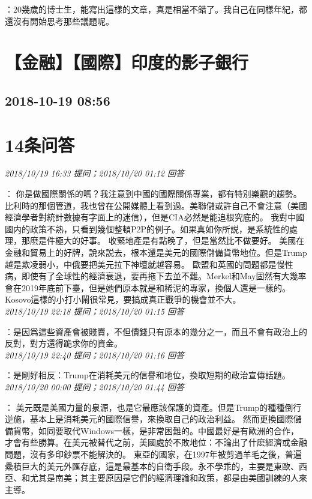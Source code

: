 \documentclass[twocolumn]{ctexart}
\begin{document}
：20幾歲的博士生，能寫出這樣的文章，真是相當不錯了。我自己在同樣年紀，都還沒有開始思考那些議題呢。
\\


\section{【金融】【國際】印度的影子銀行}
\subsection{2018-10-19 08:56}


\section{14条问答}

\textit{\hfill\noindent\small 2018/10/19 16:33 提问；2018/10/20 01:12 回答}

：
你是做國際關係的嗎？我注意到中國的國際關係專業，都有特別樂觀的趨勢。
比利時的那個管道，我也曾在公開媒體上看到過。美聯儲或許自己不會注意（美國經濟學者對統計數據有字面上的迷信），但是CIA必然是能追根究底的。
我對中國國内的政策不熟，只看到幾個整頓P2P的例子。如果真如你所説，是系統性的處理，那麽是件極大的好事。
收緊地產是有點晚了，但是當然比不做要好。
美國在金融和貿易上的好牌，說來説去，根本還是美元的國際儲備貨幣地位。但是Trump越是欺凌弱小，中俄要把美元拉下神壇就越容易。
歐盟和英國的問題都是慢性病，即使有了全球性的經濟衰退，要再拖下去並不難。Merkel和May固然有大幾率會在2019年底前下臺，但是她們原本就是和稀泥的專家，換個人還是一樣的。Kosovo這樣的小打小鬧很常見，要搞成真正戰爭的機會並不大。
\\

\textit{\hfill\noindent\small 2018/10/19 22:18 提问；2018/10/20 01:15 回答}

：是因爲這些資產會被賤賣，不但價錢只有原本的幾分之一，而且不會有政治上的反對，對方還得跪求你的資金。
\\

\textit{\hfill\noindent\small 2018/10/19 22:40 提问；2018/10/20 01:16 回答}

：是剛好相反：Trump在消耗美元的信譽和地位，換取短期的政治宣傳話題。
\\

\textit{\hfill\noindent\small 2018/10/20 00:00 提问；2018/10/20 01:44 回答}

：
美元既是美國力量的泉源，也是它最應該保護的資產。但是Trump的種種倒行逆施，基本上是消耗美元的國際信譽，來換取自己的政治利益。
然而更換國際儲備貨幣，如同要取代Windows一樣，是非常困難的。中國最好是有歐洲的合作，才會有些勝算。在美元被替代之前，美國處於不敗地位：不論出了什麽經濟或金融問題，沒有多印鈔票不能解決的。
東亞的國家，在1997年被剪過羊毛之後，普遍纍積巨大的美元外匯存底，這是最基本的自衛手段。永不學乖的，主要是東歐、西亞、和尤其是南美；其主要原因是它們的經濟理論和政策，都是由美國訓練的人來主導。
\\
\end{document}
